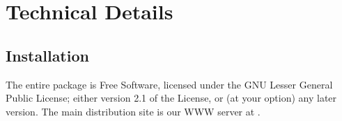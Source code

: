 %
%
%
%
%
%
%

\chapter{Technical Details}
\label{ch:install}
\section{Installation}
The entire {\gromacs} package is Free Software, licensed under the GNU
Lesser General Public License; either version 2.1 of the License, or
(at your option) any later version.
The main distribution site is our WWW server at {\wwwpage}. 

